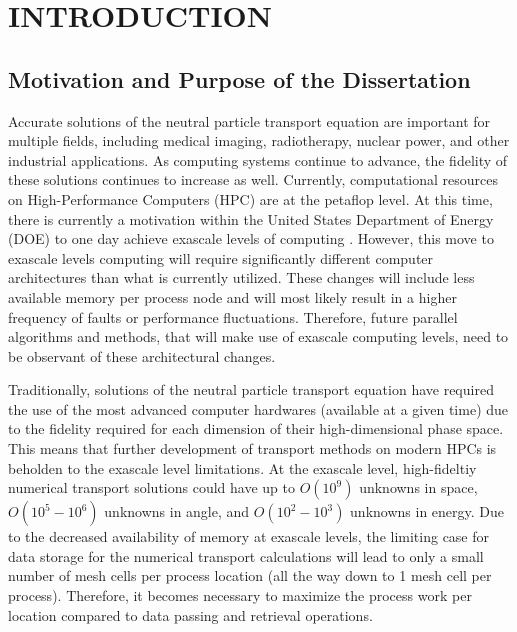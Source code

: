 %
%
%
\chapter{\uppercase {Introduction}}
\label{sec::Intro}

\section{Motivation and Purpose of the Dissertation}
\label{sec::Intro_Purpose}

Accurate solutions of the neutral particle transport equation are important for multiple fields, including medical imaging, radiotherapy, nuclear power, and other industrial applications. As computing systems continue to advance, the fidelity of these solutions continues to increase as well. Currently, computational resources on High-Performance Computers (HPC) are at the petaflop level. At this time, there is currently a motivation within the United States Department of Energy (DOE) to one day achieve exascale levels of computing \cite{bergman2008exascale}. However, this move to exascale levels computing will require significantly different computer architectures than what is currently utilized. These changes will include less available memory per process node and will most likely result in a higher frequency of faults or performance fluctuations. Therefore, future parallel algorithms and methods, that will make use of exascale computing levels, need to be observant of these architectural changes.

Traditionally, solutions of the neutral particle transport equation have required the use of the most advanced computer hardwares (available at a given time) due to the fidelity required for each dimension of their high-dimensional phase space. This means that further development of transport methods on modern HPCs is beholden to the exascale level limitations. At the exascale level, high-fideltiy numerical transport solutions could have up to $O(10^9)$ unknowns in space, $O(10^5-10^6)$ unknowns in angle, and $O(10^2-10^3)$ unknowns in energy. Due to the decreased availability of memory at exascale levels, the limiting case for data storage for the numerical transport calculations will lead to only a small number of mesh cells per process location (all the way down to 1 mesh cell per process). Therefore, it becomes necessary to maximize the process work per location compared to data passing and retrieval operations. 

